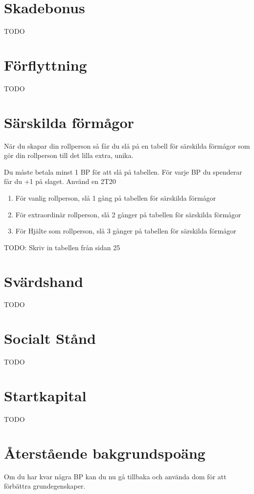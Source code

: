 \documentclass[a4paper, 10pt, titlepage]{article}
\begin{document}
\newpage
\section{Skadebonus}

TODO

\section{Förflyttning}

TODO

\section{Särskilda förmågor}
När du skapar din rollperson så får du slå på en tabell för särskilda förmågor
som gör din rollperson till det lilla extra, unika.

Du måste betala minst 1 BP för att slå på tabellen. För varje BP du spenderar
får du +1 på slaget. Använd en 2T20

\begin{enumerate}[x]
  \item För vanlig rollperson, slå 1 gång på tabellen för särskilda förmågor
  \item För extraordinär rollperson, slå 2 gånger på tabellen för särskilda förmågor
  \item För Hjälte som rollperson, slå 3 gånger på tabellen för särskilda förmågor
\end{enumerate}

TODO: Skriv in tabellen från sidan 25

\section{Svärdshand}
TODO

\section{Socialt Stånd}
TODO

\section{Startkapital}
TODO

\section{Återstående bakgrundspoäng}
Om du har kvar några BP kan du nu gå tillbaka och använda dom för att
förbättra grundegenskaper.
\end{document}
